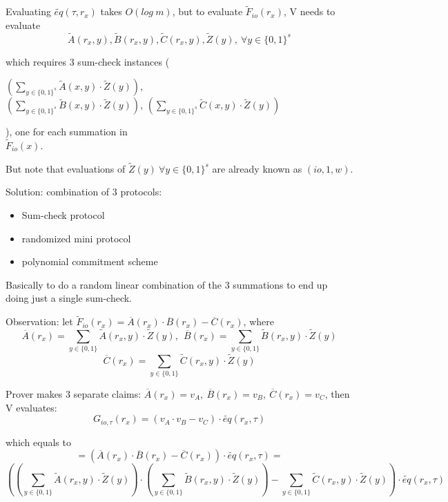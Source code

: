 \documentclass{article}
\theoremstyle{definition}
\begin{document}
Evaluating $\widetilde{eq}(\tau, r_x)$ takes $O(log~m)$, but to evaluate $\widetilde{F}_{io}(r_x)$, V needs to evaluate
$$\widetilde{A}(r_x, y), \widetilde{B}(r_x, y), \widetilde{C}(r_x, y), \widetilde{Z}(y),~ \forall y \in \{0,1\}^s$$

which requires 3 sum-check instances (\begin{scriptsize}
$\left( \sum_{y \in \{0,1\}^s} \widetilde{A}(x, y) \cdot \widetilde{Z}(y) \right)$,\\ $\left( \sum_{y \in \{0,1\}^s} \widetilde{B}(x, y) \cdot \widetilde{Z}(y) \right)$, $\left( \sum_{y \in \{0,1\}^s} \widetilde{C}(x, y) \cdot \widetilde{Z}(y) \right)$
\end{scriptsize}), one for each summation in\\ $\widetilde{F}_{io}(x)$.

But note that evaluations of $\widetilde{Z}(y) ~\forall y \in \{0,1\}^s$ are already known as $(io, 1, w)$.

Solution: combination of 3 protocols:
\begin{itemize}
	\item Sum-check protocol
	\item randomized mini protocol
	\item polynomial commitment scheme
\end{itemize}
Basically to do a random linear combination of the 3 summations to end up doing just a single sum-check.

Observation: let $\widetilde{F}_{io}(r_x) = \overline{A}(r_x) \cdot \overline{B}(r_x) - \overline{C}(r_x)$, where
$$\overline{A}(r_x) = \sum_{y \in \{0,1\}} \widetilde{A}(r_x, y) \cdot \widetilde{Z}(y),~~\overline{B}(r_x) = \sum_{y \in \{0,1\}} \widetilde{B}(r_x, y) \cdot \widetilde{Z}(y)$$
$$\overline{C}(r_x) = \sum_{y \in \{0,1\}} \widetilde{C}(r_x, y) \cdot \widetilde{Z}(y)$$

Prover makes 3 separate claims: $\overline{A}(r_x)=v_A,~ \overline{B}(r_x)=v_B,~ \overline{C}(r_x)=v_C$,
then V evaluates:
$$G_{io, \tau}(r_x) = (v_A \cdot v_B - v_C) \cdot \widetilde{eq}(r_x, \tau)$$


\begin{footnotesize}
	which equals to
	$$=\left(\overline{A}(r_x) \cdot \overline{B}(r_x) - \overline{C}(r_x)\right) \cdot \widetilde{eq}(r_x, \tau)=$$
	$$\left(\left(\sum_{y \in \{0,1\}} \widetilde{A}(r_x, y) \cdot \widetilde{Z}(y)\right) \cdot \left(\sum_{y \in \{0,1\}} \widetilde{B}(r_x, y) \cdot \widetilde{Z}(y)\right) - \sum_{y \in \{0,1\}} \widetilde{C}(r_x, y) \cdot \widetilde{Z}(y)\right) \cdot \widetilde{eq}(r_x, \tau)$$
\end{footnotesize}
\end{document}
